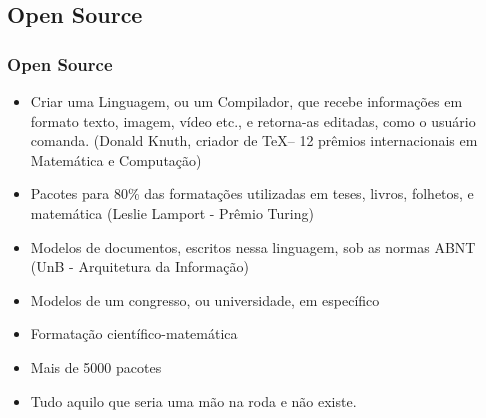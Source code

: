 \documentclass[9pt]{beamer}
\begin{document}
\begin{frame}

  \section{Open Source}
  \frametitle{
    {{\textcolor{red}{{\LARGE{}}}} %
      \textcolor{red!85!black}{Open Source}}}


  \begin{tcolorbox}[colback=blue!5!white, colframe=violet!65!white,
    left*=1mm,
    title={\sc{\bf{Questões já resolvidas}}}]

    \begin{itemize}
    \item<3->[{\textcolor{violet!70!white}{\ding{166}}}]\alert{Criar} uma Linguagem, ou um Compilador, que recebe informações em formato
      texto, imagem, vídeo etc., e retorna-as editadas, como o
      usuário comanda. (Donald Knuth, criador de \TeX -- 12 prêmios
      internacionais em Matemática e Computação)
    \item<4->[{\textcolor{violet!70!white}{\ding{166}}}] Pacotes para 80\% das formatações utilizadas em teses,
      livros, folhetos, e matemática (Leslie Lamport - Prêmio Turing)
    \item<5->[{\textcolor{violet!70!white}{\ding{166}}}]{Modelos de documentos, escritos nessa linguagem, sob as
        normas  ABNT} (UnB - Arquitetura da Informação)
    \item<6->[{\textcolor{violet!70!white}{\ding{166}}}]{Modelos de um congresso, ou universidade, em específico}
    \item<6->[{\textcolor{violet!70!white}{\ding{166}}}]{Formatação científico-matemática}
    \item<6->[{\textcolor{violet!70!white}{\ding{166}}}]{Mais de 5000 pacotes}
    \end{itemize}

  \end{tcolorbox}

  \begin{tcolorbox}[title=O que ainda falta?]

    \begin{itemize}
    \item<1->[{\textcolor{blue!50!black}{\ding{69}}}] Tudo aquilo que seria uma mão na roda \alert{e} não
      existe.
    \end{itemize}

  \end{tcolorbox}

\end{frame}
\end{document}
